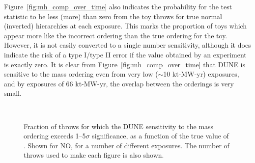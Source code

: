 Figure~\ref{fig:mh_comp_over_time} also indicates the probability for the test statistic \dchisq to be less (more) than zero from the toy throws for true normal (inverted) hierarchies at each exposure. This marks the proportion of toys which appear more like the incorrect ordering than the true ordering for the toy. However, it is not easily converted to a single number sensitivity, although it does indicate the risk of a type I/type II error if the \dchisq value obtained by an experiment is exactly zero. It is clear from Figure~\ref{fig:mh_comp_over_time} that DUNE is sensitive to the mass ordering even from very low ($\sim$10 kt-MW-yr) exposures, and by exposures of 66 kt-MW-yr, the overlap between the orderings is very small.

\begin{figure*}[htbp]
  \centering
  \\
  \caption{Fraction of throws for which the DUNE sensitivity to the mass ordering exceeds 1--5$\sigma$ significance, as a function of the true value of \deltacp. Shown for NO, for a number of different exposures. The number of throws used to make each figure is also shown.}
  \label{fig:mh_nh_over_time}
\end{figure*}

